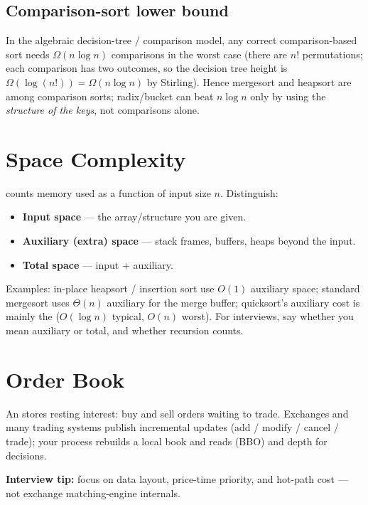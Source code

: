 \subsection{Comparison-sort lower bound}
In the algebraic decision-tree / comparison model, any correct comparison-based
sort needs $\Omega(n\log n)$ comparisons in the worst case (there are $n!$ permutations;
each comparison has two outcomes, so the decision tree height is
$\Omega(\log(n!)) = \Omega(n\log n)$ by Stirling).
Hence mergesort and heapsort are  among comparison sorts;
radix/bucket can beat $n\log n$ only by using the \emph{structure of the keys}, not
comparisons alone.

\section{Space Complexity}
\label{sec:space-complexity}
 counts memory used as a function of input size $n$.
Distinguish:
\begin{itemize}
    \item \textbf{Input space} --- the array/structure you are given.
    \item \textbf{Auxiliary (extra) space} --- stack frames, buffers, heaps beyond the input.
    \item \textbf{Total space} --- input + auxiliary.
\end{itemize}
Examples: in-place heapsort / insertion sort use $O(1)$ auxiliary space; 
standard mergesort uses $\Theta(n)$ auxiliary for the merge buffer; 
quicksort's auxiliary cost is mainly the  
($O(\log n)$ typical, $O(n)$ worst). 
For interviews, say whether you mean auxiliary or total, and whether recursion counts.

\section{Order Book}
\label{sec:order-book}
An  stores resting interest: buy and sell orders waiting to trade. 
Exchanges and many trading systems publish incremental updates (add / modify / cancel / trade); 
your process rebuilds a local book and reads  (BBO) and depth for 
decisions.
\par\noindent\textbf{Interview tip:} focus on data layout, price-time priority, and hot-path cost --- not exchange 
matching-engine internals.

